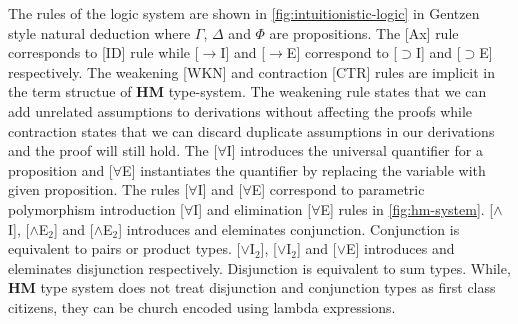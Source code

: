 The rules of the logic system are shown in \cref{fig:intuitionistic-logic} in Gentzen style natural deduction
where $\Gamma$, $\Delta$ and $\Phi$ are propositions. The [Ax] rule corresponds to [ID] rule while [$\rightarrow$I] and [$\rightarrow$E] correspond
to [$\supset$I] and [$\supset$E] respectively. The weakening [WKN] and contraction [CTR] rules are implicit in the term structue of \textbf{HM} type-system.
The weakening rule states that we can add unrelated assumptions to derivations without
affecting the proofs while contraction states that we can discard duplicate assumptions in our derivations and the
proof will still hold. The [$\forall$I] introduces the universal quantifier for a proposition and [$\forall$E] instantiates
the quantifier by replacing the variable with given proposition. The rules [$\forall$I] and [$\forall$E] correspond to parametric polymorphism
introduction [$\forall$I] and elimination [$\forall$E] rules in \cref{fig:hm-system}. [$\wedge$I], [$\wedge$E$_2$] and [$\wedge$E$_2$] introduces and eleminates
conjunction. Conjunction is equivalent to pairs or product types. [$\vee$I$_2$], [$\vee$I$_2$] and [$\vee$E] introduces and eleminates disjunction respectively.
Disjunction is equivalent to sum types. While, \textbf{HM} type system does not treat disjunction and conjunction types as first class citizens,
they can be church encoded using lambda expressions\citep{pierce_tapl_2005}.


